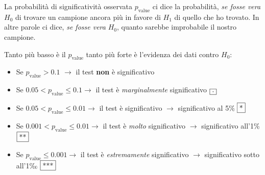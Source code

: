 \documentclass[
  11pt,
]{book}
\providecommand{\tightlist}{%
  \setlength{\itemsep}{0pt}\setlength{\parskip}{0pt}}
\theoremstyle{mytheoremstyle}
\theoremstyle{mydefstyle}
\newenvironment{nota}
  {
\begin{tcolorbox}[enhanced,breakable,arc=0.1mm,boxrule=1pt,colback=white,colframe=iblue,title=\bf \fontfamily{lmss}\selectfont \faInfoCircle \hspace{.5 cm} Nota,drop fuzzy shadow]
}{
\end{tcolorbox}
  }
\begin{document}
La probabilità di significatività osservata \(p_\text{value}\) ci dice la
probabilità, \emph{se fosse vera} \(H_0\) di trovare un campione ancora più in
favore di \(H_1\) di quello che ho trovato. In altre parole ci dice, \emph{se
fosse vera} \(H_0\), quanto sarebbe improbabile il nostro campione.

\begin{nota}

Tanto più basso è il \(p_\text{value}\) tanto più forte è l'evidenza dei
dati contro \(H_0\):

\begin{itemize}
\tightlist
\item
  Se \(p_\text{value}>0.1\) \(\rightarrow\) il test \textbf{non} è significativo
\item
  Se \(0.05< p_\text{value}\le 0.1\rightarrow\) il test è \emph{marginalmente} significativo \(\fbox{.}\)
\item
  Se \(0.05< p_\text{value}\le 0.01\rightarrow\) il test è significativo
  \(\rightarrow\) significativo al 5\% \(\fbox{*}\)
\item
  Se \(0.001< p_\text{value}\le 0.01\rightarrow\) il test è \emph{molto} significativo \(\rightarrow\) significativo all'1\% \(\fbox{**}\)
\item
  Se \(p_\text{value}\le 0.001\rightarrow\) il test è \emph{estremamente} significativo \(\rightarrow\) significativo sotto all'1‰ \(\fbox{***}\)
\end{itemize}

\end{nota}
\end{document}
